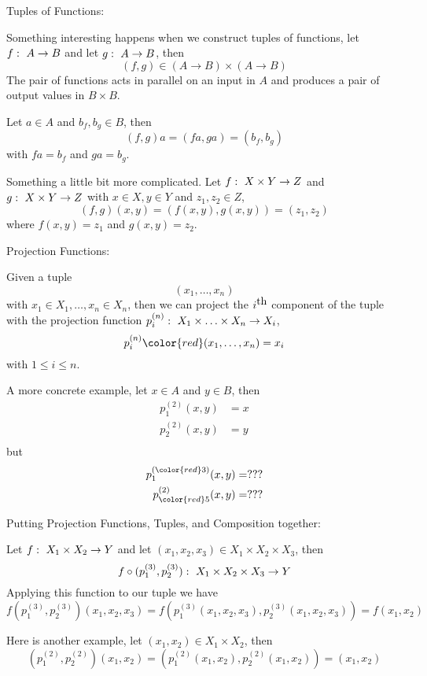 \documentclass[a4paper,blends,pdf,colorBG,slideColor]{prosper}
\begin{document}
\small
Tuples of Functions:

Something interesting happens when we construct tuples of functions, let $f\,\colon\; A \rightarrow B$
and let $g\,\colon\; A \rightarrow B$, then
\[
(f,g) \in (A\rightarrow B)\times (A\rightarrow B)
\]
The pair of functions acts in parallel on an input in $A$ and produces a pair of output values in $B\times B$.

Let $a\in A$ and $b_f, b_g\in B$, then
\[
(f,g) a = (f a, g a) = (b_f, b_g)
\]
with $f a = b_f$ and $g a= b_g$.

Something a little bit more complicated.  Let $f\,\colon\; X\times Y \rightarrow Z$ and $g\,\colon\; X\times Y \rightarrow Z$ with $x\in X, y\in Y$ and $z_1, z_2\in Z$,
\[
(f,g)(x,y) = \left (f (x,y), g (x,y)\right) = \left (z_1, z_2\right )
\]
where $f (x,y) = z_1$ and $g (x,y) = z_2$.
\es

\small
Projection Functions:

Given a tuple
\[
(x_1,\ldots,x_n)
\]
with $x_1\in X_1,\ldots,x_n\in X_n$, then we can project the $i^{\mbox{\rm th}}$ component of the 
tuple with the projection function $p^{(n)}_i\,\colon\; X_1\times\ldots\times X_n \rightarrow X_i$,
\[
p^{(n)}_i {\color{red}(x_1,\ldots,x_n)} = x_i
\]
with $1 \le i \le n$.

A more concrete example, let $x\in A$ and $y\in B$, then
\begin{align*}
p^{(2)}_1 (x,y) &= x\\
p^{(2)}_2 (x,y) &= y\\
\end{align*}
but
\begin{align*}
p^{({\color{red}3})}_1 (x,y) &= ???\\
p^{(2)}_{\color{red}5} (x,y) &= ???\\
\end{align*}
\es

\small
Putting Projection Functions, Tuples, and Composition together:

Let $f\,\colon\; X_1\times X_2 \rightarrow Y$ and let $(x_1,x_2,x_3)\in X_1\times X_2\times X_3$, then
\[
f \circ (p_1^{(3)},p_2^{(3)}) \,\colon\; X_1\times X_2 \times X_3 \rightarrow Y
\]
Applying this function to our tuple we have
\[
f (p_1^{(3)},p_2^{(3)})(x_1,x_2,x_3) = f (p_1^{(3)}(x_1,x_2,x_3),p_2^{(3)}(x_1,x_2,x_3)) = f (x_1,x_2)
\]

Here is another example, let $(x_1,x_2)\in X_1\times X_2$, then
\[
(p_1^{(2)},p_2^{(2)}) (x_1,x_2) = (p_1^{(2)}(x_1,x_2),p_2^{(2)}(x_1,x_2)) = (x_1,x_2)
\]
\es
\end{document}

